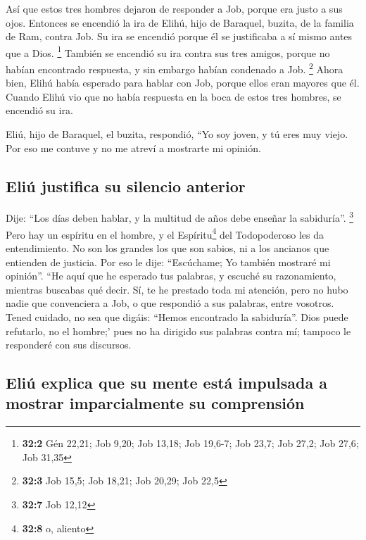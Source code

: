 \begin{paracol}{2}
 Así que estos tres hombres dejaron de responder a Job,
porque era justo a sus ojos.  Entonces se encendió la ira
de Elihú, hijo de Baraquel, buzita, de la familia de Ram, contra Job. Su
ira se encendió porque él se justificaba a sí mismo antes que a Dios.
\footnote{\textbf{32:2} Gén 22,21; Job 9,20; Job 13,18; Job 19,6-7; Job
  23,7; Job 27,2; Job 27,6; Job 31,35}  También se
encendió su ira contra sus tres amigos, porque no habían encontrado
respuesta, y sin embargo habían condenado a Job. \footnote{\textbf{32:3}
  Job 15,5; Job 18,21; Job 20,29; Job 22,5}  Ahora bien,
Elihú había esperado para hablar con Job, porque ellos eran mayores que
él.  Cuando Elihú vio que no había respuesta en la boca de
estos tres hombres, se encendió su ira.

 Eliú, hijo de Baraquel, el buzita, respondió, ``Yo soy
joven, y tú eres muy viejo. Por eso me contuve y no me atreví a
mostrarte mi opinión.

\hypertarget{eliuxfa-justifica-su-silencio-anterior}{%
\subsection{Eliú justifica su silencio
anterior}\label{eliuxfa-justifica-su-silencio-anterior}}

 Dije: ``Los días deben hablar, y la multitud de años debe
enseñar la sabiduría''. \footnote{\textbf{32:7} Job 12,12}
 Pero hay un espíritu en el hombre, y el
Espíritu\footnote{\textbf{32:8} o, aliento} del Todopoderoso les da
entendimiento.  No son los grandes los que son sabios, ni
a los ancianos que entienden de justicia.  Por eso le
dije: ``Escúchame; Yo también mostraré mi opinión''. 
``He aquí que he esperado tus palabras, y escuché su razonamiento,
mientras buscabas qué decir.  Sí, te he prestado toda mi
atención, pero no hubo nadie que convenciera a Job, o que respondió a
sus palabras, entre vosotros.  Tened cuidado, no sea que
digáis: ``Hemos encontrado la sabiduría''. Dios puede refutarlo, no el
hombre;'  pues no ha dirigido sus palabras contra mí;
tampoco le responderé con sus discursos.

\hypertarget{eliuxfa-explica-que-su-mente-estuxe1-impulsada-a-mostrar-imparcialmente-su-comprensiuxf3n}{%
\subsection{Eliú explica que su mente está impulsada a mostrar
imparcialmente su
comprensión}\label{eliuxfa-explica-que-su-mente-estuxe1-impulsada-a-mostrar-imparcialmente-su-comprensiuxf3n}}


\end{paracol}
